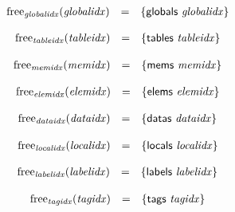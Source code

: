 $$
\begin{array}[t]{@{}lcl@{}l@{}}
{\mathrm{free}}_{\mathit{globalidx}}({\mathit{globalidx}}) & = & \{ \mathsf{globals}~{\mathit{globalidx}} \} \\
\end{array}
$$

$$
\begin{array}[t]{@{}lcl@{}l@{}}
{\mathrm{free}}_{\mathit{tableidx}}({\mathit{tableidx}}) & = & \{ \mathsf{tables}~{\mathit{tableidx}} \} \\
\end{array}
$$

$$
\begin{array}[t]{@{}lcl@{}l@{}}
{\mathrm{free}}_{\mathit{memidx}}({\mathit{memidx}}) & = & \{ \mathsf{mems}~{\mathit{memidx}} \} \\
\end{array}
$$

$$
\begin{array}[t]{@{}lcl@{}l@{}}
{\mathrm{free}}_{\mathit{elemidx}}({\mathit{elemidx}}) & = & \{ \mathsf{elems}~{\mathit{elemidx}} \} \\
\end{array}
$$

$$
\begin{array}[t]{@{}lcl@{}l@{}}
{\mathrm{free}}_{\mathit{dataidx}}({\mathit{dataidx}}) & = & \{ \mathsf{datas}~{\mathit{dataidx}} \} \\
\end{array}
$$

$$
\begin{array}[t]{@{}lcl@{}l@{}}
{\mathrm{free}}_{\mathit{localidx}}({\mathit{localidx}}) & = & \{ \mathsf{locals}~{\mathit{localidx}} \} \\
\end{array}
$$

$$
\begin{array}[t]{@{}lcl@{}l@{}}
{\mathrm{free}}_{\mathit{labelidx}}({\mathit{labelidx}}) & = & \{ \mathsf{labels}~{\mathit{labelidx}} \} \\
\end{array}
$$

$$
\begin{array}[t]{@{}lcl@{}l@{}}
{\mathrm{free}}_{\mathit{tagidx}}({\mathit{tagidx}}) & = & \{ \mathsf{tags}~{\mathit{tagidx}} \} \\
\end{array}
$$

